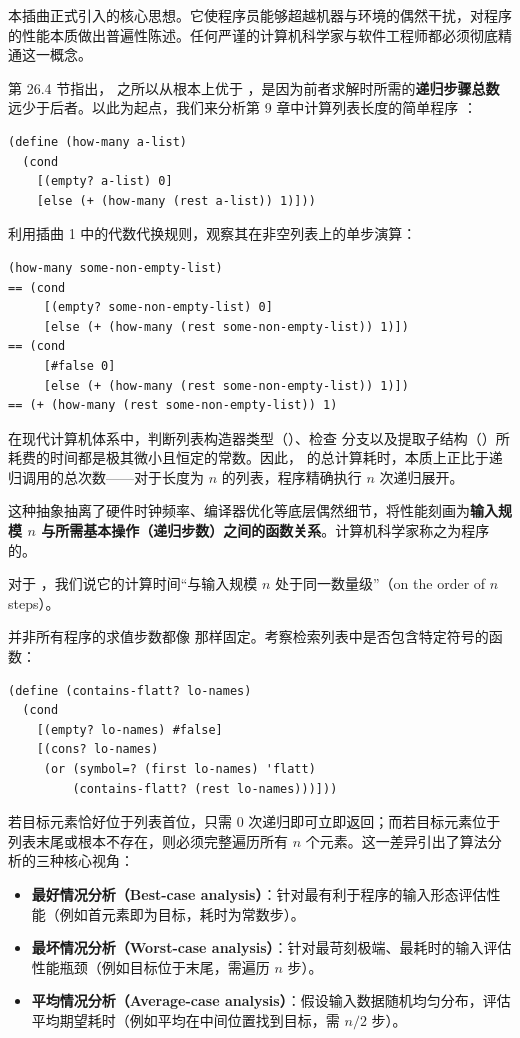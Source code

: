 本插曲正式引入的核心思想。它使程序员能够超越机器与环境的偶然干扰，对程序的性能本质做出普遍性陈述。任何严谨的计算机科学家与软件工程师都必须彻底精通这一概念。


第 26.4 节指出， 之所以从根本上优于 ，是因为前者求解时所需的\textbf{递归步骤总数}远少于后者。以此为起点，我们来分析第 9 章中计算列表长度的简单程序 ：

\begin{lstlisting}[language=BSL]
(define (how-many a-list)
  (cond
    [(empty? a-list) 0]
    [else (+ (how-many (rest a-list)) 1)]))
\end{lstlisting}

利用插曲 1 中的代数代换规则，观察其在非空列表上的单步演算：
\begin{lstlisting}[language=BSL]
  (how-many some-non-empty-list)
== (cond
     [(empty? some-non-empty-list) 0]
     [else (+ (how-many (rest some-non-empty-list)) 1)])
== (cond
     [#false 0]
     [else (+ (how-many (rest some-non-empty-list)) 1)])
== (+ (how-many (rest some-non-empty-list)) 1)
\end{lstlisting}

在现代计算机体系中，判断列表构造器类型（）、检查  分支以及提取子结构（）所耗费的时间都是极其微小且恒定的常数。因此， 的总计算耗时，本质上正比于递归调用的总次数——对于长度为 $n$ 的列表，程序精确执行 $n$ 次递归展开。

这种抽象抽离了硬件时钟频率、编译器优化等底层偶然细节，将性能刻画为\textbf{输入规模 $n$ 与所需基本操作（递归步数）之间的函数关系}。计算机科学家称之为程序的。

对于 ，我们说它的计算时间“与输入规模 $n$ 处于同一数量级”（on the order of $n$ steps）。

并非所有程序的求值步数都像  那样固定。考察检索列表中是否包含特定符号的函数：
\begin{lstlisting}[language=BSL]
(define (contains-flatt? lo-names)
  (cond
    [(empty? lo-names) #false]
    [(cons? lo-names)
     (or (symbol=? (first lo-names) 'flatt)
         (contains-flatt? (rest lo-names)))]))
\end{lstlisting}

若目标元素恰好位于列表首位，只需 0 次递归即可立即返回；而若目标元素位于列表末尾或根本不存在，则必须完整遍历所有 $n$ 个元素。这一差异引出了算法分析的三种核心视角：
\begin{itemize}
  \item \textbf{最好情况分析（Best-case analysis）}：针对最有利于程序的输入形态评估性能（例如首元素即为目标，耗时为常数步）。
  \item \textbf{最坏情况分析（Worst-case analysis）}：针对最苛刻极端、最耗时的输入评估性能瓶颈（例如目标位于末尾，需遍历 $n$ 步）。
  \item \textbf{平均情况分析（Average-case analysis）}：假设输入数据随机均匀分布，评估平均期望耗时（例如平均在中间位置找到目标，需 $n/2$ 步）。
\end{itemize}

